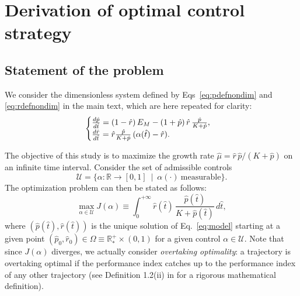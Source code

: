 \section{Derivation of optimal control strategy}
\label{sec:supp_S3}

\subsection{Statement of the problem}

We consider the dimensionless system defined by Eqs~\ref{eq:pdefnondim} and \ref{eq:rdefnondim} in the main text, which are here repeated for clarity:
\begin{equation}{\label{eq:model}}
\begin{cases}
\frac{d\hat{p}}{d\hat{t}} = (1-\hat{r})\, E_M - (1+\hat{p})\, \hat{r} \, \frac{\hat{p}}{K+\hat{p}}, \\
\frac{d\hat{r}}{d\hat{t}} = \hat{r} \frac{\hat{p}}{K + \hat{p}} \, (\alpha (\hat{t}) - \hat{r}).
\end{cases}
\end{equation}

The objective of this study is to maximize the growth rate $\hat{\mu}= \hat{r}\, \hat{p}/(K+\hat{p})$ on an infinite time interval.
Consider the set of admissible controls
\[
\mathcal{U}=\{\alpha:\mathbb{R} \rightarrow [0,1] \ \mid \ \alpha(\cdot) \ \mathrm{measurable}\}.
\]
The optimization problem can then be stated as follows:
\begin{equation}\label{Prob}\tag{P}
\max_{\alpha \in \mathcal{U}} J(\alpha)\equiv \int_0^{+\infty} \hat{r}(\hat{t}) \, \dfrac{\hat{p}(\hat{t})}{K+\hat{p}(\hat{t})}\, d\hat{t},
\end{equation}
where $(\hat{p}(\hat{t}),\hat{r}(\hat{t}))$ is the unique solution of Eq.~\ref{eq:model} starting at a given point $(\hat{p}_0,\hat{r}_0)\in \Omega \equiv \mathbb{R}^+_* \times (0,1)$ for a given control $\alpha\in \mathcal{U}$.
Note that since $J(\alpha)$ diverges, we actually consider \textit{overtaking optimality}: a trajectory is overtaking optimal if the performance index catches up to the performance
index of any other trajectory (see Definition 1.2(ii) in\cite{carlson_infinite_1991} for a rigorous mathematical definition). 

